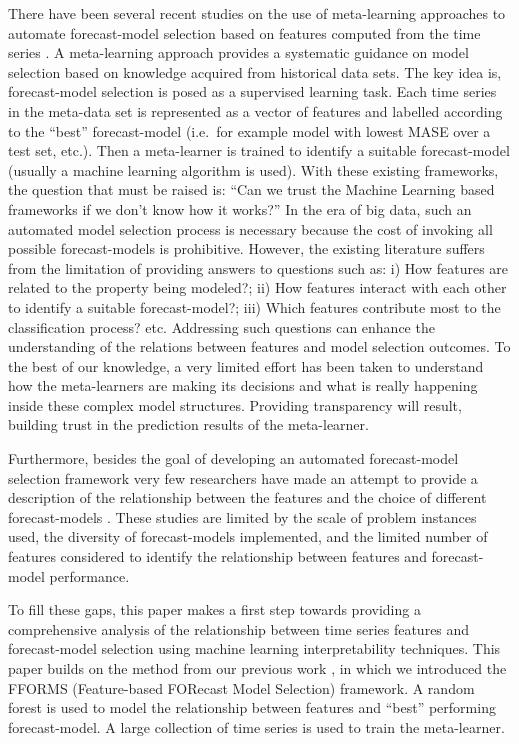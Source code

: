 \documentclass[11pt,a4paper,]{article}
\begin{document}
There have been several recent studies on the use of meta-learning approaches to automate forecast-model selection based on features computed from the time series \autocites{shah1997model}{prudencio2004meta}{lemke2010meta}{kuck2016meta}. A meta-learning approach provides a systematic guidance on model selection based on knowledge acquired from historical data sets. The key idea is, forecast-model selection is posed as a supervised learning task. Each time series in the meta-data set is represented as a vector of features and labelled according to the ``best'' forecast-model (i.e.~for example model with lowest MASE over a test set, etc.). Then a meta-learner is trained to identify a suitable forecast-model (usually a machine learning algorithm is used). With these existing frameworks, the question that must be raised is: ``Can we trust the Machine Learning based frameworks if we don't know how it works?'' In the era of big data, such an automated model selection process is necessary because the cost of invoking all possible forecast-models is prohibitive. However, the existing literature suffers from the limitation of providing answers to questions such as: i) How features are related to the property being modeled?; ii) How features interact with each other to identify a suitable forecast-model?; iii) Which features contribute most to the classification process? etc. Addressing such questions can enhance the understanding of the relations between features and model selection outcomes. To the best of our knowledge, a very limited effort has been taken to understand how the meta-learners are making its decisions and what is really happening inside these complex model structures. Providing transparency will result, building trust in the prediction results of the meta-learner.

Furthermore, besides the goal of developing an automated forecast-model selection framework very few researchers have made an attempt to provide a description of the relationship between the features and the choice of different forecast-models \autocites{schnaars1984situational}{wang2009rule}{lemke2010meta}[ are among some exceptions]{petropoulos2014horses}. These studies are limited by the scale of problem instances used, the diversity of forecast-models implemented, and the limited number of features considered to identify the relationship between features and forecast-model performance.

To fill these gaps, this paper makes a first step towards providing a comprehensive analysis of the relationship between time series features and forecast-model selection using machine learning interpretability techniques. This paper builds on the method from our previous work \textcite{fforms}, in which we introduced the FFORMS (Feature-based FORecast Model Selection) framework. A random forest is used to model the relationship between features and ``best'' performing forecast-model. A large collection of time series is used to train the meta-learner.
\end{document}
